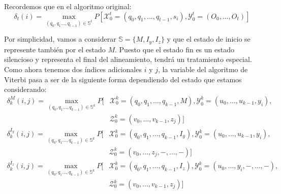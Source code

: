 Recordemos que en el algoritmo original:
\[
    \delta_t(i)=\max_{(q_0,q_1\dots,q_{t-1})\in\mathbb{S}^t}P[\mathcal{X}_0^{t}=(q_0,q_1,\dots,q_{t-1},s_i),\mathcal{Y}_0^t=(O_0,\dots,O_t)]
\]

Por simplicidad, vamos a considerar $\mathbb{S}=\{M,I_y,I_z\}$ y que el estado de inicio se represente también por el estado $M$. Puesto que el estado fin es un estado silencioso y representa el final del alineamiento, tendrá un tratamiento especial. Como ahora tenemos dos índices adicionales $i$ y $j$, la variable del algoritmo de Viterbi pasa a ser de la siguiente forma dependiendo del estado que estamos considerando:
\[
\begin{aligned}
    \delta_{k}^M(i,j)= \max_{(q_0,q_1\dots,q_{k-1})\in\mathbb{S}^k}P[&\mathcal{X}_0^{k}=(q_0,q_1,\dots,q_{k-1},M),\mathcal{Y}_0^k=(u_0,\dots,u_{k-1},y_i),\\ &\mathcal{Z}_0^k=(v_0,\dots,v_{k-1},z_j)]
\end{aligned}
\] 
\[
\begin{aligned}
    \delta_{k}^{I_y}(i,j)= \max_{(q_0,q_1\dots,q_{k-1})\in\mathbb{S}^k}P[&\mathcal{X}_0^{k}=(q_0,q_1,\dots,q_{k-1},I_y),\mathcal{Y}_0^k=(u_0,\dots,u_{k-1},y_i),\\ &\mathcal{Z}_0^k=(v_0,\dots,z_j,-,\dots,-)]
\end{aligned}
\]
\[
\begin{aligned}
    \delta_{k}^{I_z}(i,j)= \max_{(q_0,q_1\dots,q_{k-1})\in\mathbb{S}^k}P[&\mathcal{X}_0^{k}=(q_0,q_1,\dots,q_{k-1},I_z),\mathcal{Y}_0^k=(u_0,\dots,y_i,-,\dots,-),\\ &\mathcal{Z}_0^k=(v_0,\dots,v_{k-1},z_j)]
\end{aligned}
\]
